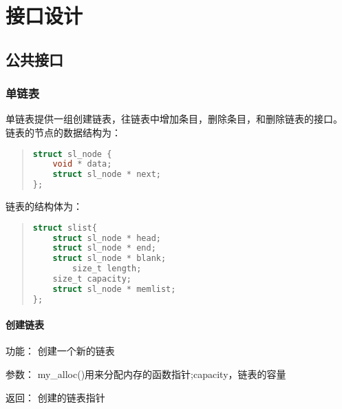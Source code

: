 %
%
\section{接口设计}
\subsection{公共接口}
\subsubsection{单链表}
单链表提供一组创建链表，往链表中增加条目，删除条目，和删除链表的接口。
链表的节点的数据结构为：

\begin{quote}
\begin{lstlisting}[language={C}]
struct sl_node {
	void * data;
	struct sl_node * next;
};
\end{lstlisting}
\end{quote}

链表的结构体为：
\begin{quote}
\begin{lstlisting}[language={C}]
struct slist{
	struct sl_node * head;
	struct sl_node * end;
	struct sl_node * blank;
        size_t length;
	size_t capacity;
	struct sl_node * memlist; 
};
\end{lstlisting}
\end{quote}

\paragraph{创建链表}
	\begin{compactdesc}
	\item[功能：]创建一个新的链表
	\item[参数：]my\_alloc()用来分配内存的函数指针;capacity，链表的容量
	\item[返回：]创建的链表指针
	\end{compactdesc}
